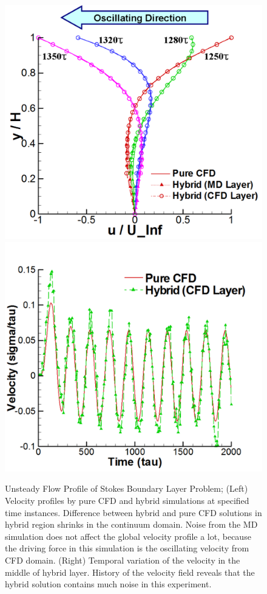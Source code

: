 \documentclass[preprint,12pt]{elsarticle}
\begin{document}

\begin{figure}
\centering
\includegraphics[width=0.6\linewidth]{Stokes_Sol_Profile.pdf}
\hskip 1cm
\includegraphics[width=0.6\linewidth]{Stokes_Temporal_Profile.pdf}
\vskip-0.2cm
\caption{\small Unsteady Flow Profile of Stokes Boundary Layer Problem; (Left) Velocity profiles by pure CFD and hybrid simulations at specified time instances. Difference between hybrid and pure CFD solutions in hybrid region shrinks in the continuum domain. Noise from the MD simulation does not affect the global velocity profile a lot, because the driving force in this simulation is the oscillating velocity from CFD domain. (Right) Temporal variation of the velocity in the middle of hybrid layer. History of the velocity field reveals that the hybrid solution contains much noise in this experiment.}
\label{Stokes_Sol}
\end{figure}
\end{document}
